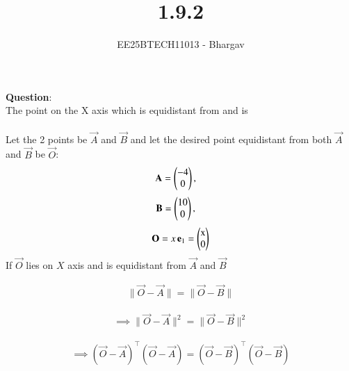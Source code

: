 \documentclass[journal]{IEEEtran}
\begin{document}

\vspace{3cm}

\title{1.9.2}
\author{EE25BTECH11013 - Bhargav}
\maketitle
{\let\newpage\relax\maketitle}

\renewcommand{\thefigure}{\theenumi}
\renewcommand{\thetable}{\theenumi}
\setlength{\intextsep}{10pt} %


\renewcommand{\thetable}{\theenumi}

\textbf{Question}:\\
The point on the X axis which is equidistant from  and  is\\ 
\solution \\
Let the 2 points be $\vec{A}$ and $\vec{B}$ and let the desired point equidistant from both $\vec{A}$ and $\vec{B}$ be $\vec{O}$:
\begin{align}
\vec{A}=\myvec{-4 \\ 0},\quad
\end{align}
\begin{align}
\vec{B}=\myvec{10 \\ 0},\quad
\end{align}
\begin{align}
\vec{O} = x\,\mathbf e_1= \myvec{$x$ \\ $0$}
\end{align}
If $\vec{O}$ lies on $X$ axis and is equidistant from $\vec{A}$ and $\vec{B}$



\begin{align}
\|\vec{O}-\vec{A}\|=\|\vec{O}-\vec{B}\|
\end{align}

\begin{align}
\implies \|\vec{O}-\vec{A}\|^2 = \|\vec{O}-\vec{B}\|^2
\end{align}

\begin{align}
\implies (\vec{O}-\vec{A})^{\top}(\vec{O}-\vec{A}) = (\vec{O}-\vec{B})^{\top}(\vec{O}-\vec{B})
\end{align}
\end{document}
